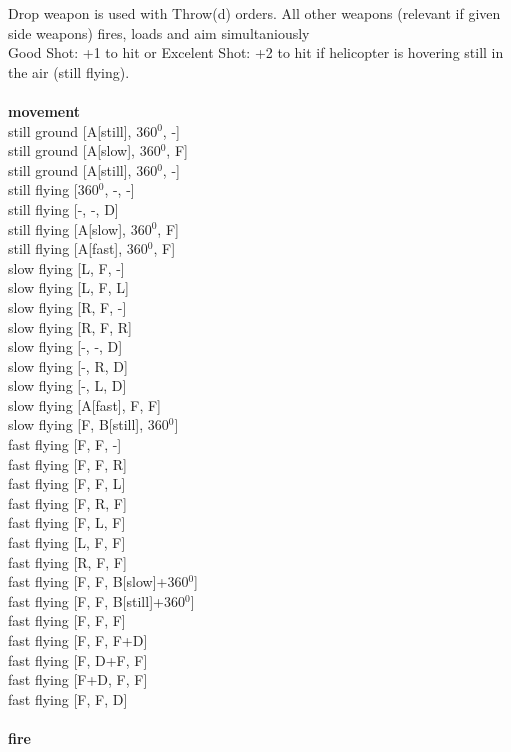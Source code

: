 \noindent Drop weapon is used with Throw(d) orders. All other weapons (relevant if given side weapons) fires, loads and aim simultaniously\\ 
Good Shot: +1 to hit or Excelent Shot: +2 to hit if helicopter is hovering still in the air (still flying).\\ 


\ \\ {\bf movement } \\
still ground [A[still], 360$^0$, -] \\
still ground [A[slow], 360$^0$, F] \\
still ground [A[still], 360$^0$, -] \\
still flying [360$^0$, -, -] \\
still flying [-, -, D] \\
still flying [A[slow], 360$^0$, F] \\
still flying [A[fast], 360$^0$, F] \\
slow flying [L, F, -] \\
slow flying [L, F, L] \\
slow flying [R, F, -] \\
slow flying [R, F, R] \\
slow flying [-, -, D] \\
slow flying [-, R, D] \\
slow flying [-, L, D] \\
slow flying [A[fast], F, F] \\
slow flying [F, B[still], 360$^0$] \\
fast flying [F, F, -] \\
fast flying [F, F, R] \\
fast flying [F, F, L] \\
fast flying [F, R, F] \\
fast flying [F, L, F] \\
fast flying [L, F, F] \\
fast flying [R, F, F] \\
fast flying [F, F, B[slow]+360$^0$] \\
fast flying [F, F, B[still]+360$^0$] \\
fast flying [F, F, F] \\
fast flying [F, F, F+D] \\
fast flying [F, D+F, F] \\
fast flying [F+D, F, F] \\
fast flying [F, F, D] \\
\ \\ {\bf fire } \\
